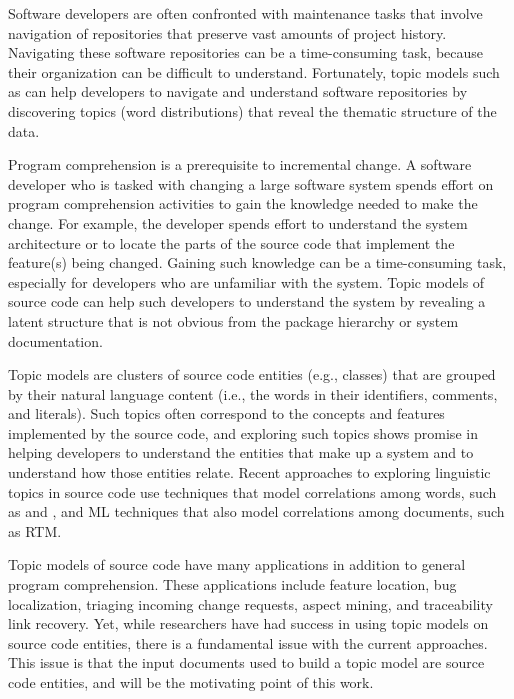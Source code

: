 Software developers are often confronted with maintenance tasks that
involve navigation of repositories that preserve vast amounts of project
history. Navigating these software repositories can be a time-consuming
task, because their organization can be difficult to understand.
Fortunately, topic models such as  can help developers to navigate and
understand software repositories by discovering topics (word
distributions) that reveal the thematic structure of the
data.

Program comprehension is a prerequisite to incremental change. A
software developer who is tasked with changing a large software system
spends effort on program comprehension activities to gain the knowledge
needed to make the change. For example, the developer
spends effort to understand the system architecture or to locate the
parts of the source code that implement the feature(s) being changed.
Gaining such knowledge can be a time-consuming task, especially for
developers who are unfamiliar with the system. Topic models of source
code can help such developers to understand the system by revealing a
latent structure that is not obvious from the package hierarchy or
system documentation.

Topic models are clusters of source code entities (e.g., classes) that
are grouped by their natural language content (i.e., the words in their
identifiers, comments, and literals). Such topics often correspond to
the concepts and features implemented by the source
code, and exploring such topics shows promise in
helping developers to understand the entities that make up a system and
to understand how those entities
relate.
Recent approaches to exploring linguistic topics in source code use
 techniques that model correlations among
words, such as  and , and ML techniques that also model
correlations among documents, such as RTM.

Topic models of source code have many applications in addition to
general program comprehension. These applications include feature
location\needcite, bug localization, triaging
incoming change requests, aspect
mining, and traceability link
recovery. Yet, while researchers have had
success in using topic models on source code entities, there is a
fundamental issue with the current approaches. This issue is that the
input documents used to build a topic model are source code entities,
and will be the motivating point of this work.

